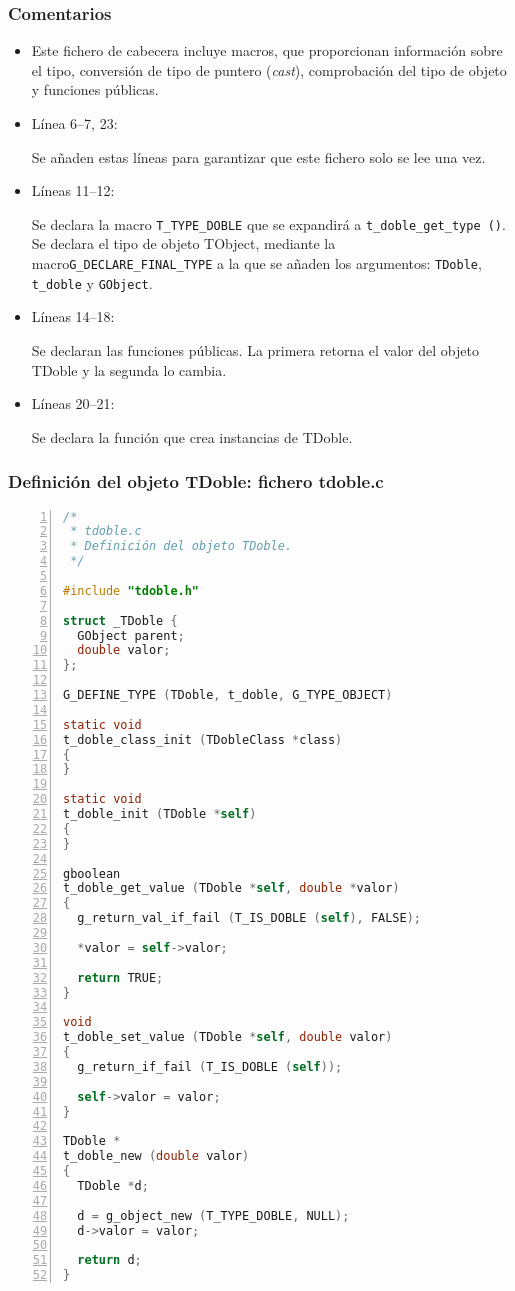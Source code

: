 \subsubsection{Comentarios}
\begin{itemize}
\item Este fichero de cabecera incluye macros, que proporcionan información sobre el tipo, conversión de
  tipo de puntero (\textit{cast}), comprobación del tipo de objeto y funciones públicas.
\item Línea 6--7, 23:\par
  Se añaden estas líneas para garantizar que este fichero solo se lee una vez.
\item Líneas 11--12:\par
  Se declara la macro \texttt{T\_TYPE\_DOBLE} que se expandirá a \texttt{t\_doble\_get\_type ()}.
  Se declara el tipo de objeto \textsf{TObject}, mediante la macro\texttt{G\_DECLARE\_FINAL\_TYPE}
  a la que se añaden los argumentos: \texttt{TDoble}, \texttt{t\_doble} y \texttt{GObject}.
\item Líneas 14--18:\par
  Se declaran las funciones públicas. La primera retorna el valor del objeto \textsf{TDoble} y la
  segunda lo cambia.
\item Líneas 20--21:\par
  Se declara la función que crea instancias de \textsf{TDoble}.
\end{itemize}

\subsubsection{Definición del objeto \textsf{TDoble}: fichero \textsf{tdoble.c}}

\begin{lstlisting}[language=C, numbers=left]
/*
 * tdoble.c
 * Definición del objeto TDoble.
 */
 
#include "tdoble.h"

struct _TDoble {
  GObject parent;
  double valor;
};

G_DEFINE_TYPE (TDoble, t_doble, G_TYPE_OBJECT)

static void
t_doble_class_init (TDobleClass *class)
{
}

static void
t_doble_init (TDoble *self)
{
}

gboolean
t_doble_get_value (TDoble *self, double *valor)
{
  g_return_val_if_fail (T_IS_DOBLE (self), FALSE);

  *valor = self->valor;
  
  return TRUE;
}

void
t_doble_set_value (TDoble *self, double valor)
{
  g_return_if_fail (T_IS_DOBLE (self));

  self->valor = valor;
}

TDoble *
t_doble_new (double valor)
{
  TDoble *d;

  d = g_object_new (T_TYPE_DOBLE, NULL);
  d->valor = valor;
  
  return d;
}
 \end{lstlisting}

